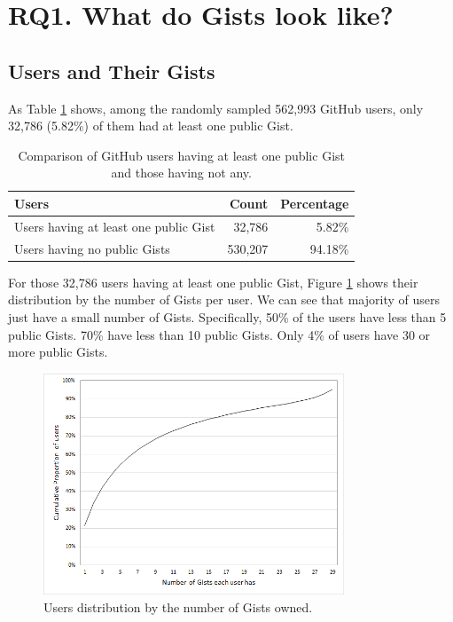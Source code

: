 \section{RQ1. What do Gists look like?}

\subsection{Users and Their Gists}

As Table \ref{tb:userdistribution} shows, among the randomly sampled 562,993 GitHub users, only 32,786 (5.82\%) of them had at least one public Gist. 

\begin{table}[!htb]
 \begin{center}
 \begin{tabular}{@{}lrr} 
    \textbf{Users} &   \textbf{Count}        &  \textbf{Percentage} \\ \hline
    Users having at least one public Gist      &   32,786                 &   5.82\%             \\ 
    Users having no public Gists               &   530,207                &   94.18\%             \\ \hline
 \end{tabular}
 \end{center}
 \caption{Comparison of GitHub users having at least one public Gist and those having not any.}
 \label{tb:userdistribution}
\end{table}

For those 32,786 users having at least one public Gist, Figure \ref{fig:gistproportion} shows their distribution by the number of Gists per user. We can see that majority of users just have a small number of Gists. Specifically, 50\% of the users have less than 5 public Gists. 70\% have less than 10 public Gists. Only 4\% of users have 30 or more public Gists.

\begin{figure}[!htb]
	\centering
	\includegraphics[width=0.8\textwidth]{figures/GistProportion.png}
	\caption{Users distribution by the number of Gists owned.}
	\label{fig:gistproportion}
\end{figure}

